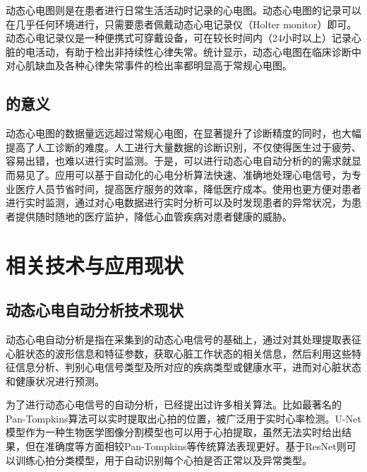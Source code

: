 动态心电图则是在患者进行日常生活活动时记录的心电图。动态心电图的记录可以在几乎任何环境进行，只需要患者佩戴动态心电记录仪（Holter monitor）即可。动态心电记录仪是一种便携式可穿戴设备，可在较长时间内（24小时以上）记录心脏的电活动，有助于检出非持续性心律失常。统计显示，动态心电图在临床诊断中对心肌缺血及各种心律失常事件的检出率都明显高于常规心电图\cite{zhengDongtaixindiantuyuchangguixindiantuzhenduanguanxinbinghuanzhexinjiquexiejixinlushichangdelinchuangxiaoguobijiao2011}。

\subsection{\app 的意义}\label{subsec:app-significance}

动态心电图的数据量远远超过常规心电图，在显著提升了诊断精度的同时，也大幅提高了人工诊断的难度。人工进行大量数据的诊断识别，不仅使得医生过于疲劳、容易出错，也难以进行实时监测。于是，可以进行动态心电自动分析的\app 的需求就显而易见了。应用可以基于自动化的心电分析算法快速、准确地处理心电信号，为专业医疗人员节省时间，提高医疗服务的效率，降低医疗成本。使用\app 也更方便对患者进行实时监测，通过对心电数据进行实时分析可以及时发现患者的异常状况，为患者提供随时随地的医疗监护，降低心血管疾病对患者健康的威胁。


\section{相关技术与应用现状}\label{sec:status}

\subsection{动态心电自动分析技术现状}\label{subsec:automatic-analysis}

动态心电自动分析是指在采集到的动态心电信号的基础上，通过对其处理提取表征心脏状态的波形信息和特征参数，获取心脏工作状态的相关信息，然后利用这些特征信息分析、判别心电信号类型及所对应的疾病类型或健康水平，进而对心脏状态和健康状况进行预测\cite{jiXindianxinhaozidongfenxiguanjianjishuyanjiu2006}。

为了进行动态心电信号的自动分析，已经提出过许多相关算法。比如最著名的Pan-Tompkins算法\cite{panRealTimeQRSDetection1985}可以实时提取出心拍的位置，被广泛用于实时心率检测。U-Net模型\cite{ronnebergerUNetConvolutionalNetworks2015}作为一种生物医学图像分割模型也可以用于心拍提取，虽然无法实时给出结果，但在准确度等方面相较Pan-Tompkins等传统算法表现更好。基于ResNet\cite{heDeepResidualLearning2015}则可以训练心拍分类模型，用于自动识别每个心拍是否正常以及异常类型。

